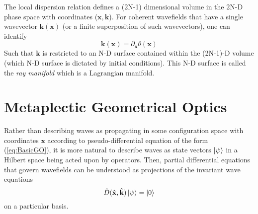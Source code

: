 \documentclass{article}
\begin{document}
The local dispersion relation defines a (2N-1) dimensional
volume in the 2N-D phase space with coordinates ($\mathbf{x},\mathbf{k}$). For coherent wavefields that have a single wavevector $\mathbf{k}(\mathbf{x})$ (or a finite superposition of such wavevectors), one can identify
\begin{equation}
    \mathbf{k}(\mathbf{x}) = \partial_\mathbf{x}\theta(\mathbf{x})
\end{equation}
Such that $\mathbf{k} $ is restricted to an N-D surface
contained within the (2N-1)-D volume (which N-D surface is
dictated by initial conditions). This N-D surface is called
the \textit{ray manifold} which is a Lagrangian manifold.
\section{Metaplectic Geometrical Optics}
Rather than describing waves as propagating in some
configuration space with coordinates $\mathbf{x}$ according to
pseudo-differential equation of the form (\ref{eq:BasicGO}), it
is more natural to describe waves as state vectors $\ket{\psi}$
in a Hilbert space being acted upon by operators. Then, partial
differential equations that govern wavefields can be understood
as projections of the invariant wave equations 
\begin{equation}
    \hat{D}(\hat{\mathbf{x}},\hat{\mathbf{k}})\ket{\psi} = \ket{0}
\end{equation}
on a particular basis.

\appendix
\end{document}
